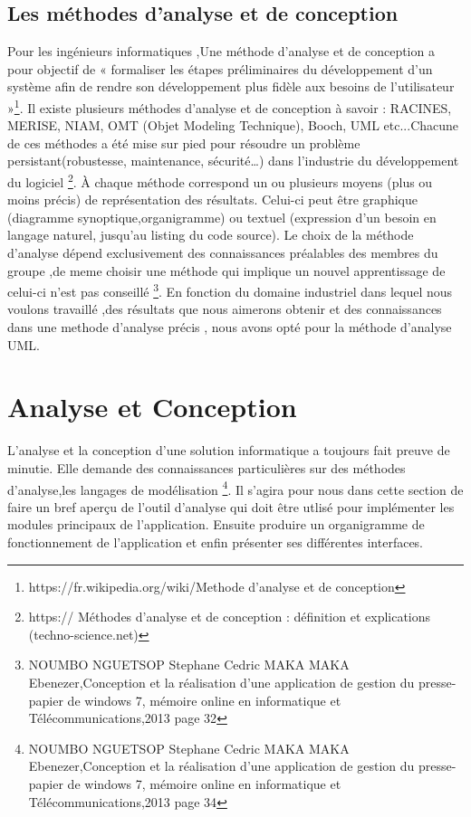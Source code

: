 \documentclass[a4paper, 12pt]{article}
\begin{document}
\subsection{Les méthodes d’analyse et de conception}
\quad Pour les ingénieurs informatiques ,Une méthode d’analyse et de conception a pour objectif de « formaliser les étapes préliminaires du développement d’un système afin de rendre son développement plus fidèle aux besoins de l’utilisateur »\footnote{https://fr.wikipedia.org/wiki/Methode d'analyse et de conception}. Il existe plusieurs méthodes d’analyse et de conception à savoir : RACINES, MERISE, NIAM, OMT (Objet Modeling Technique), Booch, UML etc...Chacune de ces méthodes a été mise sur pied pour résoudre un problème persistant(robustesse, maintenance, sécurité…) dans l’industrie du développement du logiciel \footnote{https:// Méthodes d'analyse et de conception : définition et explications (techno-science.net)}. À chaque méthode correspond un ou plusieurs moyens (plus ou moins précis) de représentation des résultats. Celui-ci peut être graphique (diagramme synoptique,organigramme) ou textuel (expression d’un besoin en langage naturel, jusqu’au listing du code source). Le choix de la méthode d’analyse dépend exclusivement des connaissances préalables des membres du groupe ,de meme choisir une méthode qui implique un nouvel apprentissage de celui-ci n’est pas conseillé \footnote{NOUMBO NGUETSOP Stephane Cedric MAKA MAKA Ebenezer,Conception et la réalisation d'une application de gestion du presse-papier de windows 7, mémoire  online en informatique et Télécommunications,2013 page 32}. En fonction du domaine industriel dans lequel nous voulons travaillé ,des résultats que nous aimerons obtenir et des connaissances dans une methode d'analyse précis , nous avons opté pour la méthode d’analyse UML.


\section{Analyse et Conception}
\quad L’analyse et la conception d’une solution informatique a toujours fait preuve de minutie. Elle demande des connaissances particulières sur des méthodes d’analyse,les langages de modélisation \footnote{NOUMBO NGUETSOP Stephane Cedric MAKA MAKA Ebenezer,Conception et la réalisation d'une application de gestion du presse-papier de windows 7, mémoire  online en informatique et Télécommunications,2013 page 34}. Il s’agira pour nous dans cette section de faire un bref aperçu de l'outil d'analyse qui doit être utlisé pour implémenter les modules principaux de l'application. Ensuite produire un organigramme de fonctionnement de l'application et enfin présenter ses différentes interfaces.
\end{document}
